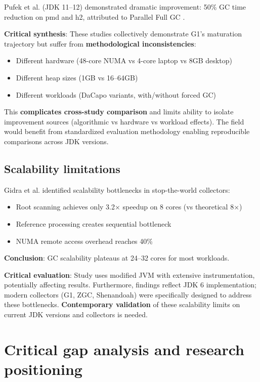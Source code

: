 Pufek et al. \cite{pufek2019analysis} (JDK 11--12) demonstrated dramatic improvement: 50\% GC time reduction on pmd and h2, attributed to Parallel Full GC \cite{jep307}.

\textbf{Critical synthesis}: These studies collectively demonstrate G1's maturation trajectory but suffer from \textbf{methodological inconsistencies}:
\begin{itemize}
    \item Different hardware (48-core NUMA vs 4-core laptop vs 8GB desktop)
    \item Different heap sizes (1GB vs 16--64GB)
    \item Different workloads (DaCapo variants, with/without forced GC)
\end{itemize}

This \textbf{complicates cross-study comparison} and limits ability to isolate improvement sources (algorithmic vs hardware vs workload effects). The field would benefit from standardized evaluation methodology enabling reproducible comparisons across JDK versions.

\subsection{Scalability limitations}
\label{subsec:scalability}

Gidra et al. \cite{gidra2011assessing} identified scalability bottlenecks in stop-the-world collectors:
\begin{itemize}
    \item Root scanning achieves only 3.2× speedup on 8 cores (vs theoretical 8×)
    \item Reference processing creates sequential bottleneck
    \item NUMA remote access overhead reaches 40\%
\end{itemize}

\textbf{Conclusion}: GC scalability plateaus at 24--32 cores for most workloads.

\textbf{Critical evaluation}: Study uses modified JVM with extensive instrumentation, potentially affecting results. Furthermore, findings reflect JDK 6 implementation; modern collectors (G1, ZGC, Shenandoah) were specifically designed to address these bottlenecks. \textbf{Contemporary validation} of these scalability limits on current JDK versions and collectors is needed.

\section{Critical gap analysis and research positioning}
\label{sec:research-gaps}

